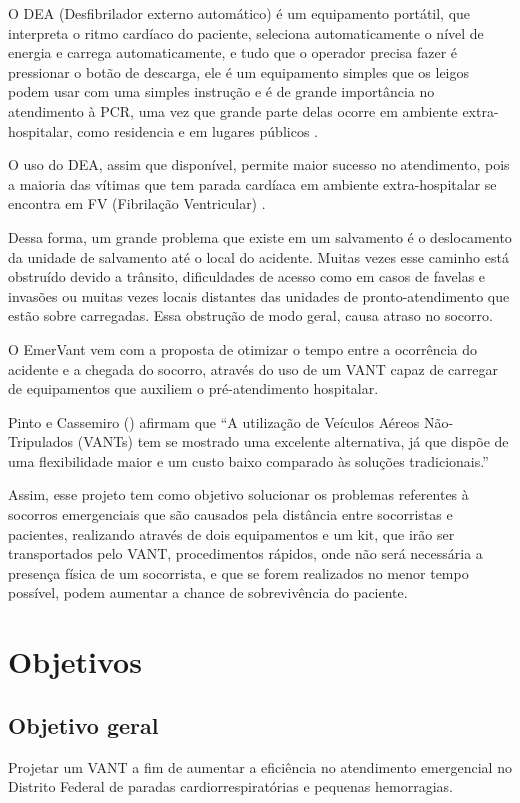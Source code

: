 O DEA (Desfibrilador externo automático) é um equipamento portátil, que interpreta o ritmo cardíaco do paciente, seleciona automaticamente o nível de energia e carrega automaticamente, e tudo que o operador precisa fazer é pressionar o botão de descarga, ele é um equipamento simples que os leigos podem usar com uma simples instrução e é de grande importância no atendimento à PCR, uma vez que grande parte delas ocorre em ambiente extra-hospitalar, como residencia e em lugares públicos \cite{SBC}.

O uso do DEA, assim que disponível, permite maior sucesso no atendimento, pois a maioria das vítimas que tem parada cardíaca em ambiente extra-hospitalar se encontra em FV (Fibrilação Ventricular) \cite{SBC}.

Dessa forma, um grande  problema  que existe em um salvamento é o deslocamento da unidade de salvamento até o local do acidente. Muitas vezes esse caminho está obstruído devido a trânsito, dificuldades de acesso como em casos de favelas e invasões ou muitas vezes locais distantes das unidades de pronto-atendimento que estão sobre carregadas. Essa obstrução de modo geral, causa atraso no socorro.

O  EmerVant  vem  com a  proposta  de otimizar  o tempo  entre  a ocorrência do acidente  e a chegada  do socorro, através do uso de um VANT capaz de carregar de equipamentos que auxiliem o pré-atendimento hospitalar. 

Pinto e Cassemiro (\citeyear{pinto}) afirmam que ``A utilização de Veículos Aéreos Não-Tripulados (VANTs) tem se mostrado uma excelente alternativa, já que dispõe de uma flexibilidade maior e um custo baixo comparado às soluções tradicionais.''

Assim, esse projeto tem como objetivo solucionar os problemas referentes à socorros emergenciais que são causados pela distância entre socorristas e pacientes, realizando através de dois equipamentos e um kit, que irão ser transportados pelo VANT, procedimentos rápidos, onde não será necessária a presença física de um socorrista, e que se forem realizados no menor tempo possível, podem aumentar a chance de sobrevivência do paciente.

\section{Objetivos}
\subsection{Objetivo geral}
Projetar um VANT a fim de aumentar a eficiência no atendimento emergencial no Distrito Federal de paradas cardiorrespiratórias e pequenas hemorragias.

